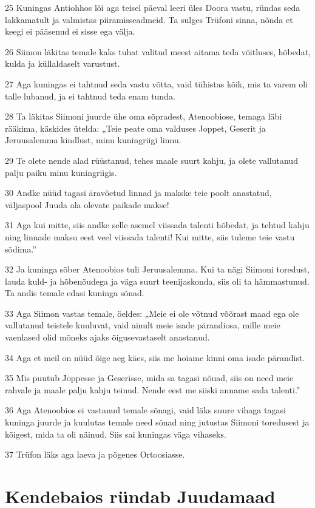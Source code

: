 \par 25 Kuningas Antiohhos lõi aga teisel päeval leeri üles Doora vastu, ründas seda lakkamatult ja valmistas piiramisseadmeid. Ta sulges Trüfoni sinna, nõnda et keegi ei pääsenud ei sisse ega välja.
\par 26 Siimon läkitas temale kaks tuhat valitud meest aitama teda võitluses, hõbedat, kulda ja küllaldaselt varustust.
\par 27 Aga kuningas ei tahtnud seda vastu võtta, vaid tühistas kõik, mis ta varem oli talle lubanud, ja ei tahtnud teda enam tunda.
\par 28 Ta läkitas Siimoni juurde ühe oma sõpradest, Atenoobiose, temaga läbi rääkima, käskides ütelda: „Teie peate oma valduses Joppet, Geserit ja Jeruusalemma kindlust, minu kuningriigi linnu.
\par 29 Te olete nende alad rüüstanud, tehes maale suurt kahju, ja olete vallutanud palju paiku minu kuningriigis.
\par 30 Andke nüüd tagasi äravõetud linnad ja makske teie poolt anastatud, väljaspool Juuda ala olevate paikade makse!
\par 31 Aga kui mitte, siis andke selle asemel viissada talenti hõbedat, ja tehtud kahju ning linnade maksu eest veel viissada talenti! Kui mitte, siis tuleme teie vastu sõdima.”
\par 32 Ja kuninga sõber Atenoobios tuli Jeruusalemma. Kui ta nägi Siimoni toredust, lauda kuld- ja hõbenõudega ja väga suurt teenijaskonda, siis oli ta hämmastunud. Ta andis temale edasi kuninga sõnad.
\par 33 Aga Siimon vastas temale, öeldes: „Meie ei ole võtnud võõrast maad ega ole vallutanud teistele kuuluvat, vaid ainult meie isade pärandiosa, mille meie vaenlased olid mõneks ajaks õigusevastaselt anastanud.
\par 34 Aga et meil on nüüd õige aeg käes, siis me hoiame kinni oma isade pärandist.
\par 35 Mis puutub Joppesse ja Geserisse, mida sa tagasi nõuad, siis on need meie rahvale ja maale palju kahju teinud. Nende eest me siiski anname sada talenti.”
\par 36 Aga Atenoobios ei vastanud temale sõnagi, vaid läks suure vihaga tagasi kuninga juurde ja kuulutas temale need sõnad ning jutustas Siimoni toredusest ja kõigest, mida ta oli näinud. Siis sai kuningas väga vihaseks.
\par 37 Trüfon läks aga laeva ja põgenes Ortoosiasse. 

\section*{Kendebaios ründab Juudamaad}

